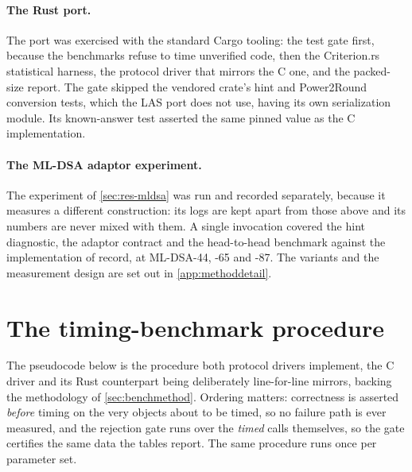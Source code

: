 \paragraph{The Rust port.}
The port was exercised with the standard Cargo tooling: the test gate first, because the
benchmarks refuse to time unverified code, then the Criterion.rs statistical harness, the
protocol driver that mirrors the C one, and the packed-size report. The gate skipped the
vendored crate's hint and Power2Round conversion tests, which the LAS port does not use,
having its own serialization module. Its known-answer test asserted the same pinned value
as the C implementation.

\paragraph{The ML-DSA adaptor experiment.}
The experiment of \cref{sec:res-mldsa} was run and recorded separately, because it measures
a different construction: its logs are kept apart from those above and its numbers are
never mixed with them. A single invocation covered the hint diagnostic, the adaptor
contract and the head-to-head benchmark against the implementation of record, at ML-DSA-44,
-65 and -87. The variants and the measurement design are set out in
\cref{app:methoddetail}.

\section{The timing-benchmark procedure}
\label{app:benchalg}

The pseudocode below is the procedure both protocol drivers implement, the C driver and its Rust counterpart being deliberately line-for-line mirrors, backing
the methodology of \cref{sec:benchmethod}. Ordering matters: correctness is
asserted \emph{before} timing on the very objects about to be timed, so no
failure path is ever measured, and the rejection gate runs over the \emph{timed}
calls themselves, so the gate certifies the same data the tables report. The
same procedure runs once per parameter set.

